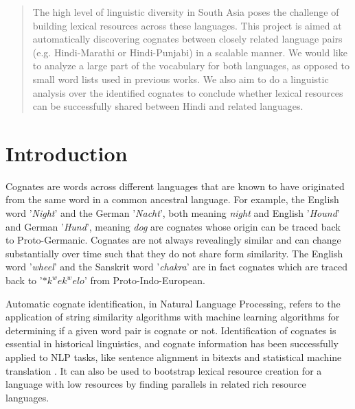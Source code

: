 \documentclass[journal]{IEEEtran}
\begin{document}




\maketitle

\begin{abstract}
The high level of linguistic diversity in South Asia poses the challenge of building lexical resources across these languages. This project is aimed at automatically discovering cognates between closely related language pairs (e.g. Hindi-Marathi or Hindi-Punjabi) in a scalable manner. We would like to analyze a large part of the vocabulary for both languages, as opposed to small word lists used in previous works. We also aim to do a linguistic analysis over the identified cognates to conclude whether lexical resources can be successfully shared between Hindi and related languages.
\end{abstract}

\section{Introduction}
Cognates are words across different languages that are known to have originated from the same word in a common ancestral language. For example, the English word '\textit{Night}' and the German '\textit{Nacht}', both meaning \textit{night} and English '\textit{Hound}' and German '\textit{Hund}', meaning \textit{dog} are cognates whose origin can be traced back to Proto-Germanic. Cognates are not always revealingly similar and can change substantially over time such that they do not share form similarity. 
The English word '\textit{wheel}' and the Sanskrit word '\textit{chakra}' are in fact cognates which are traced back to '$*k^wek^welo$' from Proto-Indo-European.

Automatic cognate identification, in Natural Language Processing, refers to the application of string similarity algorithms with machine learning algorithms for determining if a given word pair is cognate or not. Identification of cognates is essential in historical linguistics, and cognate information has been successfully applied to NLP tasks, like sentence alignment in bitexts \cite{simard1993using} and statistical machine translation \cite{kondrak2003cognates}. It can also be used to bootstrap lexical resource creation for a language with low resources by finding parallels in related rich resource languages.
\end{document}
